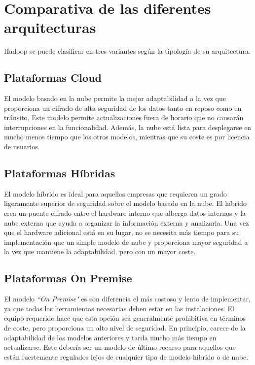 \section{Comparativa de las diferentes arquitecturas}

Hadoop se puede clasificar en tres variantes según la tipología de su arquitectura\cite{bengfort}.

\subsection{Plataformas Cloud}

El modelo basado en la nube permite la mejor adaptabilidad a la vez que proporciona un cifrado de alta seguridad de los datos tanto en reposo como en tránsito. Este modelo permite actualizaciones fuera de horario que no causarán interrupciones en la funcionalidad. Además, la nube está lista para desplegarse en mucho menos tiempo que los otros modelos, mientras que su coste es por licencia de usuarios\cite{havanki}.

\subsection{Plataformas Híbridas}

El modelo híbrido es ideal para aquellas empresas que requieren un grado ligeramente superior de seguridad sobre el modelo basado en la nube. El híbrido crea un puente cifrado entre el hardware interno que alberga datos internos y la nube externa que ayuda a organizar la información externa y analizarla. Una vez que el hardware adicional está en su lugar, no se necesita más tiempo para su implementación que un simple modelo de nube y proporciona mayor seguridad a la vez que mantiene la adaptabilidad, pero con un mayor coste. 

\subsection{Plataformas On Premise}

El modelo \textit{``On Premise"} es con diferencia el más costoso y lento de implementar, ya que todas las herramientas necesarias deben estar en las instalaciones. El equipo requerido hace que esta opción sea generalmente prohibitiva en términos de coste, pero proporciona un alto nivel de seguridad. En principio, carece de la adaptabilidad de los modelos anteriores y tarda mucho más tiempo en actualizarse. Este debería ser un modelo de último recurso para aquellos que están fuertemente regulados lejos de cualquier tipo de modelo híbrido o de nube.

